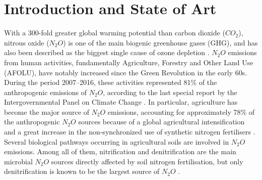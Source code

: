 \documentclass[a4paper,11pt]{article}
\begin{document}
\section{Introduction and State of Art}
With a 300-fold greater global warming potential than carbon dioxide ($CO_2$), nitrous
oxide ($N_2O$) is one of the main biogenic greenhouse gases (GHG), and has also been
described as the biggest single cause of ozone depletion \cite{ravishankara2009nitrous}. $N_2O$ emissions from human
activities, fundamentally Agriculture, Forestry and Other Land Use (AFOLU), have notably
increased since the Green Revolution in the early 60s. During the period 2007–2016,
these activities represented 81\% of the anthropogenic emissions of $N_2O$, according to the
last special report by the Intergovernmental Panel on Climate Change \cite{shukla2019climate}. In particular,
agriculture has become the major source of $N_2O$ emissions, accounting for approximately
78\% of the anthropogenic $N_2O$ sources \cite{shukla2019climate} because of a global agricultural intensification
and a great increase in the non-synchronized use of synthetic nitrogen fertilisers \cite{galloway2003nitrogen}\cite{richardson2009mitigating}\cite{taylor2010stoichiometric}.
Several biological pathways occurring in agricultural soils are involved in $N_2O$ emissions.
Among all of them, nitrification and denitrification are the main microbial $N_2O$ sources directly affected by soil nitrogen fertilisation, but only denitrification is known to be the
largest source of $N_2O$ \cite{thomson2012biological}.
\end{document}
